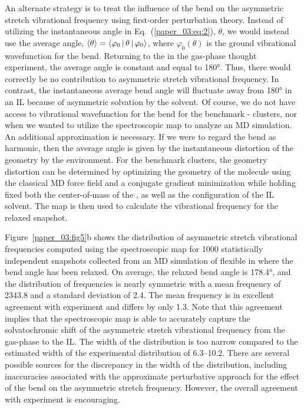 \documentclass[%
  class = book,%
  crop = false,%
  float = true,%
  multi = true,%
  preview = false,%
]{standalone}
\begin{document}
An alternate strategy is to treat the influence of the  bend on the asymmetric stretch vibrational frequency using first-order perturbation theory. Instead of utilizing the instantaneous  angle in Eq.~(\ref{paper_03:eq:2}), \(\theta\), we would instead use the average angle, \(\Braket{\theta} = \Braket{ \varphi_{0} | \theta | \varphi_{0} }\), where \(\varphi_{0}(\theta)\) is the ground vibrational wavefunction for the  bend. Returning to the  in the gas-phase thought experiment, the average angle is constant and equal to \ang{180}. Thus, there would correctly be no contribution to  asymmetric stretch vibrational frequency. In contrast, the instantaneous average bend angle will fluctuate away from \ang{180} in an IL because of asymmetric solvation by the solvent. Of course, we do not have access to vibrational wavefunction for the  bend for the benchmark -\ce{[C4C1im][PF6]} clusters, nor when we wanted to utilize the spectroscopic map to analyze an MD simulation. An additional approximation is necessary. If we were to regard the  bend as harmonic, then the average angle is given by the instantaneous distortion of the  geometry by the environment. For the benchmark clusters, the geometry distortion can be determined by optimizing the geometry of the  molecule using the classical MD force field and a conjugate gradient minimization while holding fixed both the center-of-mass of the , as well as the configuration of the IL solvent. The map is then used to calculate the vibrational frequency for the relaxed snapshot.

Figure~\ref{paper_03:fig5}b shows the distribution of  asymmetric stretch vibrational frequencies computed using the spectroscopic map for \num{1000} statistically independent snapshots collected from an MD simulation of flexible  in \ce{[C4C1im][PF6]} where the  bend angle has been relaxed. On average, the relaxed bend angle is \ang{178.4}, and the distribution of frequencies is nearly symmetric with a mean frequency of \SI{2343.8}{\wavenumber} and a standard deviation of \SI{2.4}{\wavenumber}. The mean frequency is in excellent agreement with experiment and differs by only \SI{1.3}{\wavenumber}. Note that this agreement implies that the spectroscopic map is able to accurately capture the solvatochromic shift of the  asymmetric stretch vibrational frequency from the gas-phase to the \ce{[C4C1im][PF6]} IL. The width of the distribution is too narrow compared to the estimated width of the experimental distribution of \SIrange{6.3}{10.2}{\wavenumber}. There are several possible sources for the discrepancy in the width of the distribution, including inaccuracies associated with the approximate perturbative approach for the effect of the bend on the asymmetric stretch frequency. However, the overall agreement with experiment is encouraging.
\end{document}
